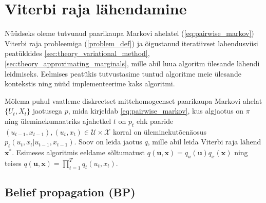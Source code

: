 \section{Viterbi raja lähendamine}

Nüüdseks oleme tutvunud paarikaupa Markovi ahelatel (\ref{eq:pairwise_markov}) Viterbi raja probleemiga (\ref{problem_def}) ja õigustanud iteratiivset lahendusviisi peatükkides \ref{sec:theory_variational_method}, \ref{sec:theory_approximating_marginals}, mille abil luua algoritm ülesande lähendi leidmiseks. Eelmises peatükis tutvustasime tuntud algoritme meie ülesande kontekstis ning nüüd implementeerime kaks algoritmi.

Mõlema puhul vaatleme diskreetset mittehomogeenset paarikaupa Markovi ahelat $\{U_t,X_t\}$ jaotusega $p$, mida kirjeldab \ref{eq:pairwise_markov}, kus algjaotus on $\pi$ ning üleminekumaatriks ajahetkel $t$ on $p_t$ ehk paaride $(u_{t-1},x_{t-1}),(u_t,x_t) \in \mathcal{U} \times \mathcal{X}$ korral on üleminekutõenäosus $p_t(u_t,x_t|u_{t-1},x_{t-1})$. Soov on leida jaotus $q$, mille abil leida Viterbi raja lähend $\bm{x}^*$. Esimeses algoritmis eeldame sõltumatust $q(\bm{u},\bm{x}) = q_u(\bm{u})q_x(\bm{x})$ ning teises $q(\bm{u},\bm{x}) = \prod_{t=1}^T q_t(u_t,x_t)$.


\subsection{Belief propagation (BP)}\label{sec:BP}




